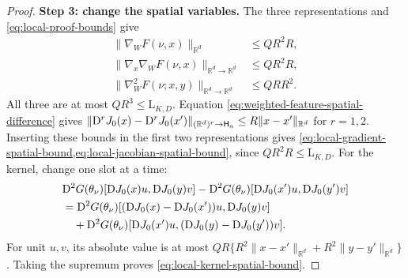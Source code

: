 \begin{proof}
\noindent\textbf{Step 3: change the spatial variables.}
The three representations and \eqref{eq:local-proof-bounds} give
\[
\begin{aligned}
 \|\nabla_WF(\nu,x)\|_{\mathbb R^d}&\le QR^2R,\\
 \|\nabla_x\nabla_WF(\nu,x)\|_{\mathbb R^d\to\mathbb R^d}&\le QR^2R,\\
 \|\nabla_W^2F(\nu;x,y)\|_{\mathbb R^d\to\mathbb R^d}&\le QRR^2.
\end{aligned}
\]
All three are at most $QR^3\le\mathrm L_{K,D}$.
Equation \eqref{eq:weighted-feature-spatial-difference} gives
$\|\mathrm{D}^rJ_0(x)-\mathrm{D}^rJ_0(x')\|_{(\mathbb R^d)^r\to\mathsf H_a}\le R\|x-x'\|_{\mathbb R^d}$ for $r=1,2$.
Inserting these bounds in the first two representations gives
\cref{eq:local-gradient-spatial-bound,eq:local-jacobian-spatial-bound},
since $QR^2R\le\mathrm L_{K,D}$.
For the kernel, change one slot at a time:
\[
\begin{aligned}
 &\mathrm{D}^2G(\theta_\nu)[\mathrm{D} J_0(x)u,\mathrm{D} J_0(y)v]
      -\mathrm{D}^2G(\theta_\nu)[\mathrm{D} J_0(x')u,\mathrm{D} J_0(y')v]\\
 &=\mathrm{D}^2G(\theta_\nu)[(\mathrm{D} J_0(x)-\mathrm{D} J_0(x'))u,\mathrm{D} J_0(y)v]\\
 &\quad+\mathrm{D}^2G(\theta_\nu)[\mathrm{D} J_0(x')u,(\mathrm{D} J_0(y)-\mathrm{D} J_0(y'))v].
\end{aligned}
\]
For unit $u,v$, its absolute value is at most
$QR\{R^2\|x-x'\|_{\mathbb R^d}+R^2\|y-y'\|_{\mathbb R^d}\}$.
Taking the supremum proves \eqref{eq:local-kernel-spatial-bound}.
\end{proof}
